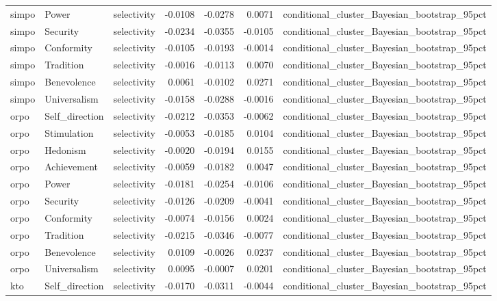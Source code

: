\begin{tabular}{lllrrrl}
simpo & Power & selectivity & -0.0108 & -0.0278 & 0.0071 & conditional\_cluster\_Bayesian\_bootstrap\_95pct \\
simpo & Security & selectivity & -0.0234 & -0.0355 & -0.0105 & conditional\_cluster\_Bayesian\_bootstrap\_95pct \\
simpo & Conformity & selectivity & -0.0105 & -0.0193 & -0.0014 & conditional\_cluster\_Bayesian\_bootstrap\_95pct \\
simpo & Tradition & selectivity & -0.0016 & -0.0113 & 0.0070 & conditional\_cluster\_Bayesian\_bootstrap\_95pct \\
simpo & Benevolence & selectivity & 0.0061 & -0.0102 & 0.0271 & conditional\_cluster\_Bayesian\_bootstrap\_95pct \\
simpo & Universalism & selectivity & -0.0158 & -0.0288 & -0.0016 & conditional\_cluster\_Bayesian\_bootstrap\_95pct \\
orpo & Self\_direction & selectivity & -0.0212 & -0.0353 & -0.0062 & conditional\_cluster\_Bayesian\_bootstrap\_95pct \\
orpo & Stimulation & selectivity & -0.0053 & -0.0185 & 0.0104 & conditional\_cluster\_Bayesian\_bootstrap\_95pct \\
orpo & Hedonism & selectivity & -0.0020 & -0.0194 & 0.0155 & conditional\_cluster\_Bayesian\_bootstrap\_95pct \\
orpo & Achievement & selectivity & -0.0059 & -0.0182 & 0.0047 & conditional\_cluster\_Bayesian\_bootstrap\_95pct \\
orpo & Power & selectivity & -0.0181 & -0.0254 & -0.0106 & conditional\_cluster\_Bayesian\_bootstrap\_95pct \\
orpo & Security & selectivity & -0.0126 & -0.0209 & -0.0041 & conditional\_cluster\_Bayesian\_bootstrap\_95pct \\
orpo & Conformity & selectivity & -0.0074 & -0.0156 & 0.0024 & conditional\_cluster\_Bayesian\_bootstrap\_95pct \\
orpo & Tradition & selectivity & -0.0215 & -0.0346 & -0.0077 & conditional\_cluster\_Bayesian\_bootstrap\_95pct \\
orpo & Benevolence & selectivity & 0.0109 & -0.0026 & 0.0237 & conditional\_cluster\_Bayesian\_bootstrap\_95pct \\
orpo & Universalism & selectivity & 0.0095 & -0.0007 & 0.0201 & conditional\_cluster\_Bayesian\_bootstrap\_95pct \\
kto & Self\_direction & selectivity & -0.0170 & -0.0311 & -0.0044 & conditional\_cluster\_Bayesian\_bootstrap\_95pct \\

\end{tabular}
